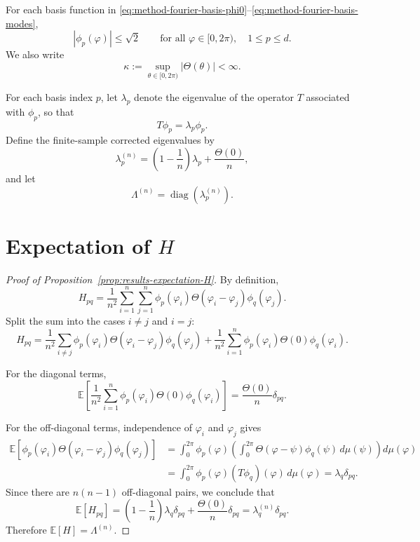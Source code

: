For each basis function in
\eqref{eq:method-fourier-basis-phi0}--\eqref{eq:method-fourier-basis-modes},
\begin{equation}
	|\phi_p(\varphi)|\le \sqrt2
	\qquad
	\text{for all }\varphi\in[0,2\pi),\quad 1\le p\le d.
	\label{eq:app-basis-bound}
\end{equation}
We also write
\begin{equation}
	\kappa:=\sup_{\theta\in[0,2\pi)}|\Theta(\theta)|<\infty.
	\label{eq:app-kappa}
\end{equation}

For each basis index \(p\), let \(\lambda_p\) denote the eigenvalue of the operator \(T\)
associated with \(\phi_p\), so that
\[
	T\phi_p=\lambda_p \phi_p.
\]
Define the finite-sample corrected eigenvalues by
\begin{equation}
	\lambda_p^{(n)}
	=
	\left(1-\frac{1}{n}\right)\lambda_p+\frac{\Theta(0)}{n},
	\label{eq:app-finite-sample-corrected-eigs}
\end{equation}
and let
\[
	\Lambda^{(n)}=\operatorname{diag}(\lambda_p^{(n)}).
\]

\section{Expectation of \(H\)}
\label{sec:app-expected-H}

\begin{proof}[Proof of Proposition~\ref{prop:results-expectation-H}]
	By definition,
	\begin{equation}
		H_{pq}
		=
		\frac{1}{n^2}\sum_{i=1}^n\sum_{j=1}^n
		\phi_p(\varphi_i)\Theta(\varphi_i-\varphi_j)\phi_q(\varphi_j).
		\label{eq:app-H-entry}
	\end{equation}
	Split the sum into the cases \(i\neq j\) and \(i=j\):
	\[
		H_{pq}
		=
		\frac{1}{n^2}\sum_{i\neq j}
		\phi_p(\varphi_i)\Theta(\varphi_i-\varphi_j)\phi_q(\varphi_j)
		+
		\frac{1}{n^2}\sum_{i=1}^n
		\phi_p(\varphi_i)\Theta(0)\phi_q(\varphi_i).
	\]

	For the diagonal terms,
	\[
		\mathbb E\!\left[
			\frac{1}{n^2}\sum_{i=1}^n
			\phi_p(\varphi_i)\Theta(0)\phi_q(\varphi_i)
			\right]
		=
		\frac{\Theta(0)}{n}\delta_{pq}.
	\]

	For the off-diagonal terms, independence of \(\varphi_i\) and \(\varphi_j\) gives
	\begin{align*}
		\mathbb E\!\left[
			\phi_p(\varphi_i)\Theta(\varphi_i-\varphi_j)\phi_q(\varphi_j)
			\right]
		 & =
		\int_0^{2\pi}\phi_p(\varphi)
		\left(
		\int_0^{2\pi}\Theta(\varphi-\psi)\phi_q(\psi)\,d\mu(\psi)
		\right)
		d\mu(\varphi) \\
		 & =
		\int_0^{2\pi}\phi_p(\varphi)(T\phi_q)(\varphi)\,d\mu(\varphi)
		=
		\lambda_q\delta_{pq}.
	\end{align*}
	Since there are \(n(n-1)\) off-diagonal pairs, we conclude that
	\[
		\mathbb E[H_{pq}]
		=
		\left(1-\frac{1}{n}\right)\lambda_q\delta_{pq}
		+
		\frac{\Theta(0)}{n}\delta_{pq}
		=
		\lambda_q^{(n)}\delta_{pq}.
	\]
	Therefore \(\mathbb E[H]=\Lambda^{(n)}\).
\end{proof}

